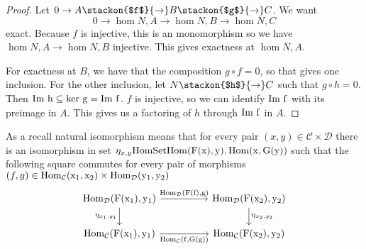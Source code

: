 \begin{proof}
     Let $0\to A\stackon{$f$}{\to} B \stackon{$g$}{\to} C$. We want \[
     0\to \hom{N,A} \to \hom{N,B}\to \hom{N,C}
     \]
     exact.
     Because $f$ is injective, this is an monomorphism so we have $\hom{N,A}\to \hom{N,B}$ injective. This gives exactness at $\hom{N,A}$.

     For exactness at $B$, we have that the composition $g\circ f=0$, so that gives one inclusion. For the other inclusion, let $N\stackon{$h$}{\to} C$ such that $g\circ h =0$. Then $\rm{Im} \ h\subseteq \rm{ker}\ g = \rm{Im} \ f$. $f$ is injective, so we can identify $\rm{Im} \ f$ with its preimage in $A$. This gives us a factoring of $h$ through $\rm{Im} \ f $ in $A$.
\end{proof}
\begin{remark}
    As a recall natural isomorphism means that for every pair $(x,y)\in \mathcal{C}\times \mathcal{D}$ there is an isomorphism in set $\eta_{x,y}\rm{Hom}{\rm{Set}}{\hom{F(x),y},\hom{x,G(y)}}$ such that the following square commutes for every pair of morphisms $(f,g) \in \rm{Hom}_{\mathcal{C}}(x_1,x_2)\times \rm{Hom}_{\mathcal{D}}(y_1,y_2)$
    \[\begin{tikzcd}
	{\rm{Hom}_{\mathcal{D}}(F(x_1),y_1)} && {\rm{Hom}_{\mathcal{D}}(F(x_2),y_2)} \\
	{\rm{Hom}_{\mathcal{C}}(F(x_1),y_1)} && {\rm{Hom}_{\mathcal{C}}(F(x_2),y_2)}
	\arrow["{\rm{Hom}_{\mathcal{D}}(F(f),g)}", from=1-1, to=1-3]
	\arrow["{\eta_{x_1,y_1}}"', from=1-1, to=2-1]
	\arrow["{\eta_{x_2,y_2}}", from=1-3, to=2-3]
	\arrow["{\rm{Hom}_{\mathcal{C}}(f,G(g))}"', from=2-1, to=2-3]
\end{tikzcd}\]
\end{remark}
